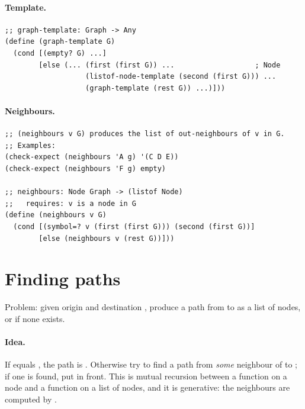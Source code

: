 \paragraph{Template.}
\begin{lstlisting}[style=racket]
;; graph-template: Graph -> Any
(define (graph-template G)
  (cond [(empty? G) ...]
        [else (... (first (first G)) ...                   ; Node
                   (listof-node-template (second (first G))) ...
                   (graph-template (rest G)) ...)]))
\end{lstlisting}

\paragraph{Neighbours.}
\begin{lstlisting}[style=racket]
;; (neighbours v G) produces the list of out-neighbours of v in G.
;; Examples:
(check-expect (neighbours 'A g) '(C D E))
(check-expect (neighbours 'F g) empty)

;; neighbours: Node Graph -> (listof Node)
;;   requires: v is a node in G
(define (neighbours v G)
  (cond [(symbol=? v (first (first G))) (second (first G))]
        [else (neighbours v (rest G))]))
\end{lstlisting}

\section{Finding paths}
Problem: given origin  and destination , produce a path
from  to  as a list of nodes, or  if none
exists.

\paragraph{Idea.} If  equals , the path is
. Otherwise try to find a path from \emph{some} neighbour of
 to ; if one is found, put  in front. This is
mutual recursion between a function on a node and a function on a list of
nodes, and it is generative: the neighbours are computed by .

